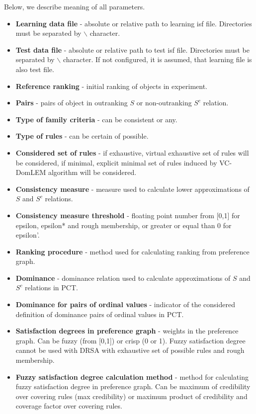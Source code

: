 Below, we describe meaning of all parameters.
\begin{itemize}
	\item \textbf{Learning data file} - absolute or relative path to learning isf file. Directories must be separated by $\backslash$ character.
	\item \textbf{Test data file} - absolute or relative path to test isf file. Directories must be separated by $\backslash$ character. If not configured, it is assumed, that learning file is also test file.
	\item \textbf{Reference ranking} - initial ranking of objects in experiment.
	\item \textbf{Pairs} - pairs of object in outranking $S$ or non-outranking $S^{c}$ relation.
	\item \textbf{Type of family criteria} - can be consistent or any.
	\item \textbf{Type of rules} - can be certain of possible.
	\item \textbf{Considered set of rules} - if exhaustive, virtual exhaustive set of rules will be considered, if minimal, explicit minimal set of rules induced by VC-DomLEM algorithm will be considered.
	\item \textbf{Consistency measure} - measure used to calculate lower approximations of $S$ and $S^{c}$ relations.
	\item \textbf{Consistency measure threshold} - floating point number from [0,1] for epsilon, epsilon* and rough membership, or greater or equal than 0 for epsilon'.
	\item \textbf{Ranking procedure} - method used for calculating ranking from preference graph.
	\item \textbf{Dominance} - dominance relation used to calculate approximations of $S$ and $S^{c}$ relations in PCT.
	\item \textbf{Dominance for pairs of ordinal values} - indicator of the considered definition of dominance pairs of ordinal values in PCT.
	\item \textbf{Satisfaction degrees in preference graph} - weights in the preference graph. Can be fuzzy (from [0,1]) or crisp (0 or 1). Fuzzy satisfaction degree cannot be used with DRSA with exhaustive set of possible rules and rough membership.
	\item \textbf{Fuzzy satisfaction degree calculation method} - method for calculating fuzzy satisfaction degree in preference graph. Can be maximum of credibility over covering rules (max credibility) or maximum product of credibility and coverage factor over covering rules.

\end{itemize}
